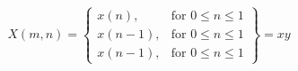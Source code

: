 \documentclass{article}
\begin{document}
  \[
    X(m,n) = \left\{\begin{array}{lr}
        x(n), & \text{for } 0\leq n\leq 1\\
        x(n-1), & \text{for } 0\leq n\leq 1\\
        x(n-1), & \text{for } 0\leq n\leq 1
        \end{array}\right\} = xy
  \]
\end{document}
